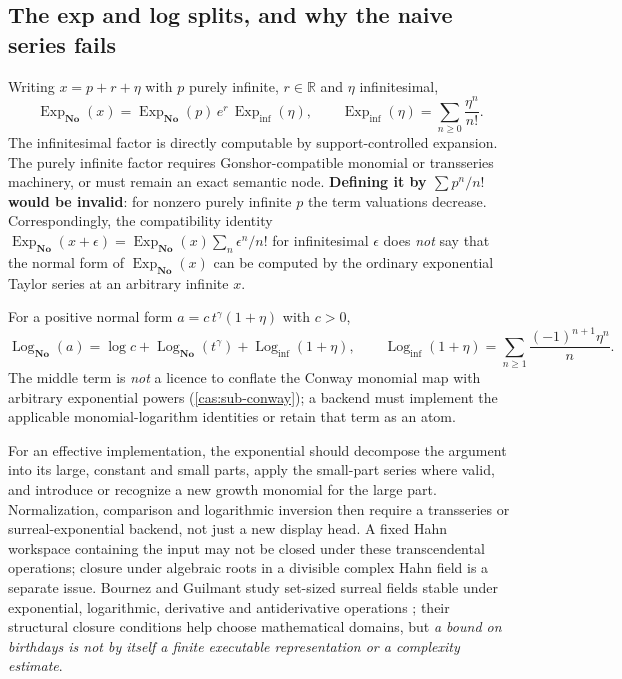 \documentclass[11pt,letterpaper]{article}
\numberwithin{equation}{section}
\theoremstyle{definition}
\theoremstyle{remark}
\newcommand{\No}{\mathbf{No}}
\newcommand{\R}{\mathbb R}
\newcommand{\ExpNo}{\operatorname{Exp}_{\No}}
\newcommand{\LogNo}{\operatorname{Log}_{\No}}
\newcommand{\Expi}{\operatorname{Exp}_{\mathrm{inf}}}
\newcommand{\Logi}{\operatorname{Log}_{\mathrm{inf}}}
\begin{document}
\subsection{The exp and log splits, and why the naive series fails}
\label{cas:sub-expsplit}
Writing $x=p+r+\eta$ with $p$ purely infinite, $r\in\R$ and $\eta$
infinitesimal,
\begin{equation}\label{cas:eq-expsplit}
 \ExpNo(x)=\ExpNo(p)\,e^r\,\Expi(\eta),\qquad
 \Expi(\eta)=\sum_{n\ge0}\frac{\eta^n}{n!}.
\end{equation}
The infinitesimal factor is directly computable by support-controlled expansion.
The purely infinite factor requires Gonshor-compatible monomial or transseries
machinery, or must remain an exact semantic node. \textbf{Defining it by
$\sum p^n/n!$ would be invalid}: for nonzero purely infinite $p$ the term
valuations decrease. Correspondingly, the compatibility identity
$\ExpNo(x+\epsilon)=\ExpNo(x)\sum_n\epsilon^n/n!$ for infinitesimal $\epsilon$
does \emph{not} say that the normal form of $\ExpNo(x)$ can be computed by the
ordinary exponential Taylor series at an arbitrary infinite $x$.

For a positive normal form $a=c\,t^\gamma(1+\eta)$ with $c>0$,
\begin{equation}\label{cas:eq-logsplit}
 \LogNo(a)=\log c+\LogNo(t^\gamma)+\Logi(1+\eta),\qquad
 \Logi(1+\eta)=\sum_{n\ge1}\frac{(-1)^{n+1}\eta^n}{n}.
\end{equation}
The middle term is \emph{not} a licence to conflate the Conway monomial map with
arbitrary exponential powers (\cref{cas:sub-conway}); a backend must implement
the applicable monomial-logarithm identities or retain that term as an atom.

For an effective implementation, the exponential should decompose the argument
into its large, constant and small parts, apply the small-part series where
valid, and introduce or recognize a new growth monomial for the large part.
Normalization, comparison and logarithmic inversion then require a transseries
or surreal-exponential backend, not just a new display head. A fixed Hahn
workspace containing the input may not be closed under these transcendental
operations; closure under algebraic roots in a divisible complex Hahn field is a
separate issue. Bournez and Guilmant study set-sized surreal fields stable under
exponential, logarithmic, derivative and antiderivative operations
\cite{cas:BG}; their structural closure conditions help choose mathematical
domains, but \emph{a bound on birthdays is not by itself a finite executable
representation or a complexity estimate}.
\end{document}
